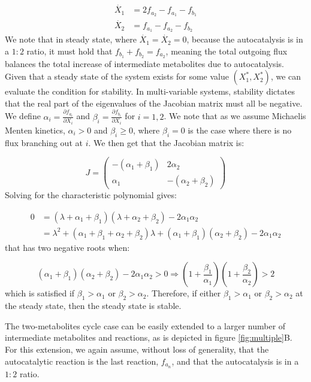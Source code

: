     \begin{align*}
        \dot{X_1} & =2f_{a_2}-f_{a_1}-f_{b_1} \\
        \dot{X_2} & =f_{a_1}-f_{a_2}-f_{b_2}
    \end{align*}
    We note that in steady state, where $\dot{X_1}=\dot{X_2}=0$, because the autocatalysis is in a $1\mathbin{:}2$ ratio, it must hold that $f_{b_1}+f_{b_2}=f_{a_2}$, meaning the total outgoing flux balances the total increase of intermediate metabolites due to autocatalysis.
    Given that a steady state of the system exists for some value $(X_1^*,X_2^*)$, we can evaluate the condition for stability.
    In multi-variable systems, stability dictates that the real part of the eigenvalues of the Jacobian matrix must all be negative.
    We define $\alpha_i=\frac{\partial f_{a_i}}{\partial X_i}$ and $\beta_i=\frac{\partial f_{b_i}}{\partial X_i}$ for $i=1,2$.
    We note that as we assume Michaelis Menten kinetics, $\alpha_i>0$ and $\beta_i \geq 0$, where $\beta_i=0$ is the case where there is no flux branching out at $i$.
    We then get that the Jacobian matrix is:

    \begin{equation*}
        J=
        \begin{pmatrix}
            -(\alpha_1+\beta_1) & 2\alpha_2 \\
            \alpha_1 & -(\alpha_2+\beta_2)
        \end{pmatrix}
    \end{equation*}
    Solving for the characteristic polynomial gives:

    \begin{align*}
        0 & =(\lambda+\alpha_1+\beta_1)(\lambda+\alpha_2+\beta_2)-2\alpha_1\alpha_2 \\
        & = \lambda^2+(\alpha_1+\beta_1+\alpha_2+\beta_2)\lambda+(\alpha_1+\beta_1)(\alpha_2+\beta_2)-2\alpha_1\alpha_2
    \end{align*}
    that has two negative roots when:

    \begin{equation*}
        (\alpha_1+\beta_1)(\alpha_2+\beta_2)-2\alpha_1\alpha_2>0 \Rightarrow (1+\frac{\beta_1}{\alpha_1})(1+\frac{\beta_2}{\alpha_2})>2
    \end{equation*}
    which is satisfied if $\beta_1 > \alpha_1$ or $\beta_2 > \alpha_2$.
    Therefore, if either $\beta_1 > \alpha_1$ or $\beta_2 > \alpha_2$ at the steady state, then the steady state is stable.

    The two-metabolites cycle case can be easily extended to a larger number of intermediate metabolites and reactions, as is depicted in figure \ref{fig:multiple}B.
    For this extension, we again assume, without loss of generality, that the autocatalytic reaction is the last reaction, $f_{a_n}$, and that the autocatalysis is in a $1\mathbin{:}2$ ratio.

